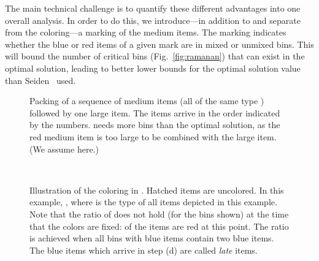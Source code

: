The main technical challenge is to quantify these different advantages into one overall analysis. 
In order to do this, we introduce---in addition to and separate from the coloring---a marking of the medium items. The marking indicates whether the blue or red items of a given mark are in mixed or unmixed bins. This will bound the number of critical bins (Fig.~\ref{fig:ramanan}) that can exist in the optimal solution, leading to better lower bounds for the optimal solution value than Seiden~\cite{Seiden02} used.

\begin{figure}
	\begin{center}
		\hspace{7mm}
	\end{center}
	\caption{Packing of a sequence of medium items (all of the same type ) followed by one large item. The items arrive in the order indicated by the numbers. \SuperH{} needs more bins than the optimal solution, as the red medium item is too large to be combined with the large item. 
		(We assume  here.) \label{fig:red-too-large}}
\end{figure}

\begin{figure}
	\begin{center}
		\hspace{7mm}
		\\
		\hspace{7mm}
	\end{center}
	\caption{\label{illus}Illustration of the coloring in \EHarm{}. Hatched items are uncolored. In this example, , where  is the type of all items depicted in this example.
		Note that the ratio of  does not hold (for the bins shown)
		at the time that the colors are fixed:  of the items are red at this point.
		The ratio  is achieved when all bins with blue items contain two blue items.
		The blue items which arrive in step (d) are called \emph{late} items.}
\end{figure}

